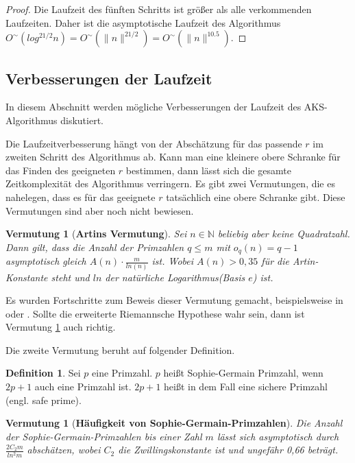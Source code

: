 \documentclass[12pt,oneside]{article}
\newtheorem{conj}[theorem]{Vermutung}
\theoremstyle{remark}
\theoremstyle{definition}
\newtheorem{definition}{Definition}[section]
\begin{document}
\begin{proof}
Die Laufzeit des fünften Schritts ist größer als alle verkommenden Laufzeiten. Daher ist die asymptotische Laufzeit des Algorithmus $O^{\sim}(log^{21/2}n) = O^{\sim}( \lVert n \rVert^{21/2}) = O^{\sim}(\lVert n \rVert^{10.5})$.\newline
\newpage

\end{proof}

\subsection{Verbesserungen der Laufzeit}
In diesem Abschnitt werden mögliche Verbesserungen der Laufzeit des AKS-Algorithmus diskutiert.\newline

Die Laufzeitverbesserung hängt von der Abschätzung für das passende $r$ im zweiten Schritt des Algorithmus ab. Kann man eine kleinere obere Schranke für das Finden des geeigneten $r$ bestimmen, dann lässt sich die gesamte Zeitkomplexität des Algorithmus verringern. Es gibt zwei Vermutungen, die es nahelegen, dass es für das geeignete $r$ tatsächlich eine obere Schranke gibt. Diese Vermutungen sind aber noch nicht bewiesen.

\begin{conj}[\textbf{Artins Vermutung}]\label{artin_conj}
Sei $n \in \mathbb{N}$ beliebig aber keine Quadratzahl. Dann gilt, dass die Anzahl der Primzahlen $q \leq m$ mit $o_{q}(n) = q - 1$ asymptotisch gleich $A(n) \cdot \frac{m}{ln(n)}$ ist. Wobei $A(n) > 0,35$ für die Artin-Konstante steht und $ln$ der natürliche Logarithmus(Basis $e$) ist.
\end{conj}

Es wurden Fortschritte zum Beweis dieser Vermutung gemacht, beispielsweise in \cite{artin} oder  \cite{artinSecond}. Sollte die erweiterte Riemannsche Hypothese wahr sein, dann ist Vermutung \ref{artin_conj} auch richtig.

Die zweite Vermutung beruht auf folgender Definition.
\begin{definition}
Sei $p$ eine Primzahl. $p$ heißt Sophie-Germain Primzahl, wenn $2p + 1$ auch eine Primzahl ist. $2p + 1$ heißt in dem Fall eine sichere Primzahl (engl. safe prime).
\end{definition}

\begin{conj}[\textbf{Häufigkeit von Sophie-Germain-Primzahlen}]\label{sophie-ger}
Die Anzahl der Sophie-Germain-Primzahlen bis einer Zahl $m$ lässt sich asymptotisch durch $\frac{2C_{2}m}{ln^2m}$ abschätzen, wobei $C_2$ die Zwillingskonstante ist und ungefähr 0,66 beträgt.
\end{conj}
\end{document}
